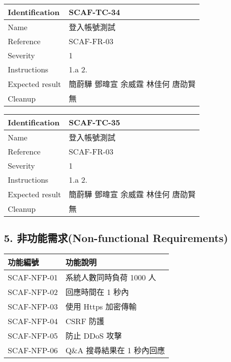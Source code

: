 \documentclass{report}
\begin{document}
\begin{tabularx}{0.9\textwidth}{
  |p{}%
  |p{}|%
  }
  \hline
  \centering Identification &  SCAF-TC-34 \\
  \hline
  \centering Name & 登入帳號測試 \\
  \hline
  \centering Reference & SCAF-FR-03 \\
  \hline
  \centering Severity & 1 \\
  \hline
  \centering Instructions & 1.a
                            2. \\
  \hline
  \centering Expected result & 簡蔚驊 \! 鄧暐宣 \! 余威霆 \! 林佳何 \! 唐劭賢 \\
  \hline
  \centering Cleanup & 無 \\
  \hline
\end{tabularx}
\newline\newline

\begin{tabularx}{0.9\textwidth}{
  |p{}%
  |p{}|%
  }
  \hline
  \centering Identification &  SCAF-TC-35 \\
  \hline
  \centering Name & 登入帳號測試 \\
  \hline
  \centering Reference & SCAF-FR-03 \\
  \hline
  \centering Severity & 1 \\
  \hline
  \centering Instructions & 1.a
                            2. \\
  \hline
  \centering Expected result & 簡蔚驊 \! 鄧暐宣 \! 余威霆 \! 林佳何 \! 唐劭賢 \\
  \hline
  \centering Cleanup & 無 \\
  \hline
\end{tabularx}
\newline\newline


\subsection*{5. 非功能需求(Non-functional Requirements)}

\begin{tabularx}{\textwidth}{
  |p{}%
  |p{}|%
}
  \hline
  功能編號 &  功能說明 \\ \hline
  SCAF-NFP-01 & 系統人數同時負荷 1000 人 \\ \hline
  SCAF-NFP-02 & 回應時間在 1 秒內 \\ \hline
  SCAF-NFP-03 & 使用 Https 加密傳輸 \\ \hline
  SCAF-NFP-04 & CSRF 防護 \\ \hline
  SCAF-NFP-05 & 防止 DDoS 攻擊 \\ \hline
  SCAF-NFP-06 & Q\&A 搜尋結果在 1 秒內回應 \\ \hline
\end{tabularx}
\end{document}
